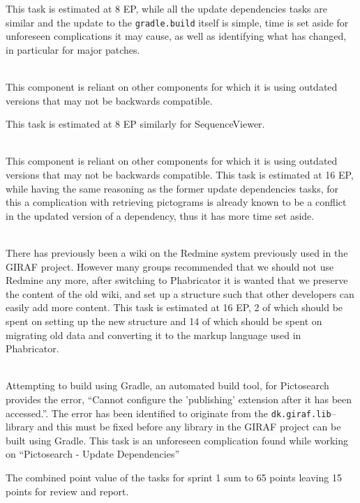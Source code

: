\begin{description}[style=unboxed]
        This task is estimated at 8 EP, while all the update dependencies tasks are similar and the update to the \texttt{gradle.build} itself is simple, time is set aside for unforeseen complications it may cause, as well as identifying what has changed, in particular for major patches.
    \item[{[}\phigh{]} Sequence --- Update dependencies] \hfill \\
        This component is reliant on other components for which it is using outdated versions that may not be backwards compatible.

        This task is estimated at 8 EP similarly for SequenceViewer.
    \item[{[}\phigh{]} Pictosearch --- Update dependencies] \hfill \\
        This component is reliant on other components for which it is using outdated versions that may not be backwards compatible.
        This task is estimated at 16 EP, while having the same reasoning as the former update dependencies tasks, for this a complication with retrieving pictograms is already known to be a conflict in the updated version of a dependency, thus it has more time set aside.
    \item[{[}\phigh{]} Wiki --- Setup new structure and migrate to Phabricator] \hfill \\
        There has previously been a wiki on the Redmine system previously used in the GIRAF project.
        However many groups recommended that we should not use Redmine any more, after switching to Phabricator it is wanted that we preserve the content of the old wiki, and set up a structure such that other developers can easily add more content.
        This task is estimated at 16 EP, 2 of which should be spent on setting up the new structure and 14 of which should be spent on migrating old data and converting it to the markup language used in Phabricator.

    \item[{[}\pblocking{]} Gradle --- Custom plug-in dk.giraf.lib for gradle breaks build] \hfill \\
        Attempting to build using Gradle, an automated build tool, for Pictosearch provides the error, \enquote{Cannot configure the 'publishing' extension after it has been accessed.}.
        The error has been identified to originate from the \texttt{dk.giraf.lib}--library and this must be fixed before any library in the GIRAF project can be built using Gradle.
        This task is an unforeseen complication found while working on \enquote{Pictosearch - Update Dependencies}
\end{description}
The combined point value of the tasks for sprint 1 sum to 65 points leaving 15 points for review and report.

